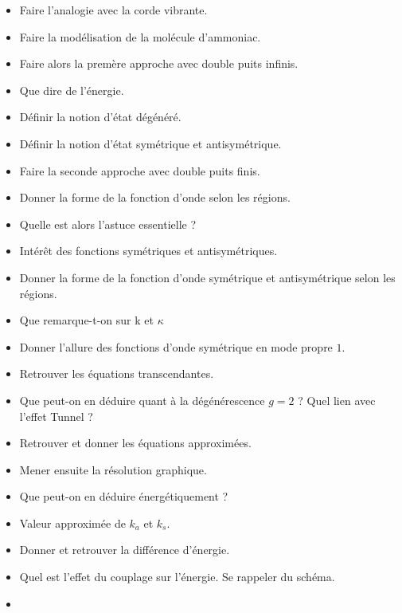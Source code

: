 \documentclass[a4paper, 11pt, hidelinks]{article}
\begin{document}
\begin{itemize}
    \item Faire l'analogie avec la corde vibrante. \cite{Chapitre23}
    \item Faire la modélisation de la molécule d'ammoniac. \cite{Chapitre23}
    \item Faire alors la premère approche avec double puits infinis. \cite{Chapitre23}
    \item Que dire de l'énergie. \cite{Chapitre23}
    \item Définir la notion d'état dégénéré. \cite{Chapitre23}
    \item Définir la notion d'état symétrique et antisymétrique. \cite{Chapitre23}
    \item Faire la seconde approche avec double puits finis. \cite{Chapitre23}
    \item Donner la forme de la fonction d'onde selon les régions. \cite{Chapitre23}
    \item Quelle est alors l'astuce essentielle ? \cite{Chapitre23}
    \item Intérêt des fonctions symétriques et antisymétriques. \cite{Chapitre23}
    \item Donner la forme de la fonction d'onde symétrique et antisymétrique selon les régions. \cite{Chapitre23}
    \item Que remarque-t-on sur k et $\kappa$ \cite{Chapitre23}
    \item Donner l'allure des fonctions d'onde symétrique en mode propre $1$. \cite{Chapitre23}
    \item Retrouver les équations transcendantes. \cite{Chapitre23}
    \item Que peut-on en déduire quant à la dégénérescence $g=2$ ? Quel lien avec l'effet Tunnel ? \cite{Chapitre23}
    \item Retrouver et donner les équations approximées. \cite{Chapitre23}
    \item Mener ensuite la résolution graphique. \cite{Chapitre23}
    \item Que peut-on en déduire énergétiquement ? \cite{Chapitre23}
    \item Valeur approximée de $k_a$ et $k_s$. \cite{Chapitre23}
    \item Donner et retrouver la différence d'énergie. \cite{Chapitre23}
    \item Quel est l'effet du couplage sur l'énergie. Se rappeler du schéma. \cite{Chapitre23}
    \item 
\end{itemize}
\end{document}
